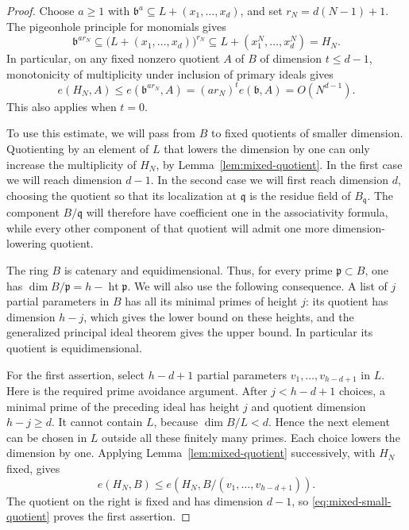 \begin{proof}
Choose $a\geq1$ with $\mathfrak b^a\subseteq L+(x_1,\ldots,x_d)$,
and set $r_N=d(N-1)+1$.  The pigeonhole principle for monomials gives
\begin{equation}\label{eq:mixed-power-containment}
 \mathfrak b^{a r_N}
 \subseteq \bigl(L+(x_1,\ldots,x_d)\bigr)^{r_N}
 \subseteq L+(x_1^N,\ldots,x_d^N)=H_N.
\end{equation}
In particular, on any fixed nonzero quotient $A$ of $B$ of dimension
$t\leq d-1$, monotonicity of multiplicity under inclusion of primary
ideals gives
\begin{equation}\label{eq:mixed-small-quotient}
 e(H_N,A)\leq e(\mathfrak b^{a r_N},A)
       =(a r_N)^t e(\mathfrak b,A)=O(N^{d-1}).
\end{equation}
This also applies when $t=0$.

To use this estimate, we will pass from $B$ to fixed quotients of
smaller dimension.  Quotienting by an element of $L$ that lowers the
dimension by one can only increase the multiplicity of $H_N$, by
Lemma~\ref{lem:mixed-quotient}.  In the first case we will reach
dimension $d-1$.  In the second case we will first reach dimension
$d$, choosing the quotient so that its localization at $\mathfrak q$
is the residue field of $B_{\mathfrak q}$.  The component
$B/\mathfrak q$ will therefore have coefficient one in the
associativity formula, while every other component of that quotient
will admit one more dimension-lowering quotient.

The ring $B$ is catenary and equidimensional.  Thus, for every prime
$\mathfrak p\subset B$, one has
$\dim B/\mathfrak p=h-\operatorname{ht}\mathfrak p$.
We will also use the following consequence.  A list of $j$ partial
parameters in $B$ has all its minimal primes of height $j$: its
quotient has dimension $h-j$, which gives the lower bound on these
heights, and the generalized principal ideal theorem gives the
upper bound.  In particular its quotient is equidimensional.

For the first assertion, select $h-d+1$ partial parameters
$v_1,\ldots,v_{h-d+1}$ in $L$.  Here is the required prime avoidance
argument.  After $j<h-d+1$ choices, a minimal prime of the preceding
ideal has height $j$ and quotient dimension $h-j\geq d$.  It cannot
contain $L$, because $\dim B/L<d$.  Hence the next element can be
chosen in $L$ outside all these finitely many primes.  Each choice
lowers the dimension by one.  Applying
Lemma~\ref{lem:mixed-quotient} successively, with $H_N$ fixed, gives
\[
 e(H_N,B)\leq e(H_N,B/(v_1,\ldots,v_{h-d+1})).
\]
The quotient on the right is fixed and has dimension $d-1$, so
\eqref{eq:mixed-small-quotient} proves the first assertion.


\end{proof}
